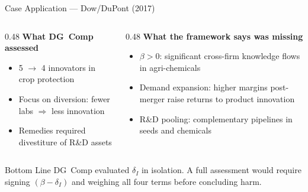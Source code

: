 \documentclass[10pt, aspectratio=169]{beamer}
\begin{document}
\begin{frame}{Case Application — Dow/DuPont (2017)}

  \begin{columns}[T]
    \begin{column}{0.48\textwidth}
      \textbf{What DG~Comp assessed}
      \begin{itemize}
        \item 5 $\to$ 4 innovators in crop protection
        \item Focus on diversion: fewer labs 
              $\Rightarrow$ less innovation
        \item Remedies required divestiture 
              of R\&D assets
      \end{itemize}
    \end{column}
    \begin{column}{0.48\textwidth}
      \textbf{What the framework says was missing}
      \begin{itemize}
        \item $\beta > 0$: significant cross-firm 
              knowledge flows in agri-chemicals
        \item Demand expansion: higher margins 
              post-merger raise returns to 
              product innovation
        \item R\&D pooling: complementary 
              pipelines in seeds and chemicals
      \end{itemize}
    \end{column}
  \end{columns}

  \medskip
  \begin{alertblock}{Bottom Line}
    DG~Comp evaluated $\delta_I$ in isolation.
    A full assessment would require signing
    $(\beta - \delta_I)$ and weighing all four terms
    before concluding harm.
  \end{alertblock}
\end{frame}
\end{document}
